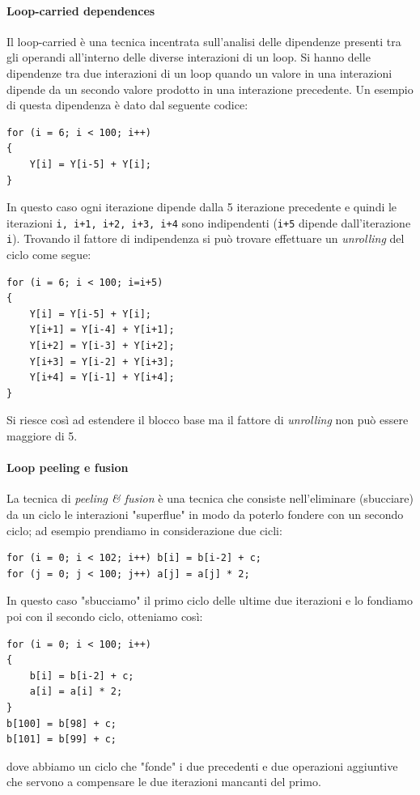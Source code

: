 \paragraph{Loop-carried dependences}
Il loop-carried è una tecnica incentrata sull'analisi delle dipendenze presenti tra gli operandi all'interno delle diverse interazioni di un loop. Si hanno delle dipendenze tra due interazioni di un loop quando un valore in una interazioni dipende da un secondo valore prodotto in una interazione precedente. Un esempio di questa dipendenza è dato dal seguente codice:
\begin{verbatim}
for (i = 6; i < 100; i++)
{
    Y[i] = Y[i-5] + Y[i];
}
\end{verbatim}
In questo caso ogni iterazione dipende dalla 5 iterazione precedente e quindi le iterazioni \texttt{i, i+1, i+2, i+3, i+4} sono indipendenti (\texttt{i+5} dipende dall'iterazione \texttt{i}). Trovando il fattore di indipendenza si può trovare effettuare un \emph{unrolling} del ciclo come segue:
\begin{verbatim}
for (i = 6; i < 100; i=i+5)
{
    Y[i] = Y[i-5] + Y[i];
    Y[i+1] = Y[i-4] + Y[i+1];
    Y[i+2] = Y[i-3] + Y[i+2];
    Y[i+3] = Y[i-2] + Y[i+3];
    Y[i+4] = Y[i-1] + Y[i+4];
}
\end{verbatim}
Si riesce così ad estendere il blocco base ma il fattore di \emph{unrolling} non può essere maggiore di 5.
\paragraph{Loop peeling e fusion}
La tecnica di \emph{peeling \& fusion} è una tecnica che consiste nell'eliminare (sbucciare) da un ciclo le interazioni "superflue" in modo da poterlo fondere con un secondo ciclo; ad esempio prendiamo in considerazione due cicli:
\begin{verbatim}
for (i = 0; i < 102; i++) b[i] = b[i-2] + c;
for (j = 0; j < 100; j++) a[j] = a[j] * 2;
\end{verbatim}
In questo caso "sbucciamo" il primo ciclo delle ultime due iterazioni e lo fondiamo poi con il secondo ciclo, otteniamo così:
\begin{verbatim}
for (i = 0; i < 100; i++)
{
    b[i] = b[i-2] + c;
    a[i] = a[i] * 2;
}
b[100] = b[98] + c;
b[101] = b[99] + c;
\end{verbatim}
dove abbiamo un ciclo che "fonde" i due precedenti e due operazioni aggiuntive che servono a compensare le due iterazioni mancanti del primo.
